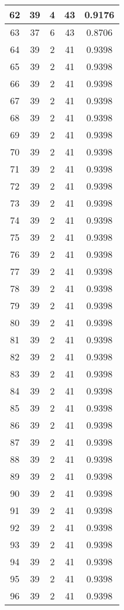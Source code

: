 \documentclass[letterpaper, 12pt]{article}
\begin{document}
\begin{longtable}{|c|c|c|c|c|}
\hline
62 & 39 & 4 & 43 & 0.9176 \\
\hline
63 & 37 & 6 & 43 & 0.8706 \\
\hline
64 & 39 & 2 & 41 & 0.9398 \\
\hline
65 & 39 & 2 & 41 & 0.9398 \\
\hline
66 & 39 & 2 & 41 & 0.9398 \\
\hline
67 & 39 & 2 & 41 & 0.9398 \\
\hline
68 & 39 & 2 & 41 & 0.9398 \\
\hline
69 & 39 & 2 & 41 & 0.9398 \\
\hline
70 & 39 & 2 & 41 & 0.9398 \\
\hline
71 & 39 & 2 & 41 & 0.9398 \\
\hline
72 & 39 & 2 & 41 & 0.9398 \\
\hline
73 & 39 & 2 & 41 & 0.9398 \\
\hline
74 & 39 & 2 & 41 & 0.9398 \\
\hline
75 & 39 & 2 & 41 & 0.9398 \\
\hline
76 & 39 & 2 & 41 & 0.9398 \\
\hline
77 & 39 & 2 & 41 & 0.9398 \\
\hline
78 & 39 & 2 & 41 & 0.9398 \\
\hline
79 & 39 & 2 & 41 & 0.9398 \\
\hline
80 & 39 & 2 & 41 & 0.9398 \\
\hline
81 & 39 & 2 & 41 & 0.9398 \\
\hline
82 & 39 & 2 & 41 & 0.9398 \\
\hline
83 & 39 & 2 & 41 & 0.9398 \\
\hline
84 & 39 & 2 & 41 & 0.9398 \\
\hline
85 & 39 & 2 & 41 & 0.9398 \\
\hline
86 & 39 & 2 & 41 & 0.9398 \\
\hline
87 & 39 & 2 & 41 & 0.9398 \\
\hline
88 & 39 & 2 & 41 & 0.9398 \\
\hline
89 & 39 & 2 & 41 & 0.9398 \\
\hline
90 & 39 & 2 & 41 & 0.9398 \\
\hline
91 & 39 & 2 & 41 & 0.9398 \\
\hline
92 & 39 & 2 & 41 & 0.9398 \\
\hline
93 & 39 & 2 & 41 & 0.9398 \\
\hline
94 & 39 & 2 & 41 & 0.9398 \\
\hline
95 & 39 & 2 & 41 & 0.9398 \\
\hline
96 & 39 & 2 & 41 & 0.9398 \\

\end{longtable}
\end{document}
